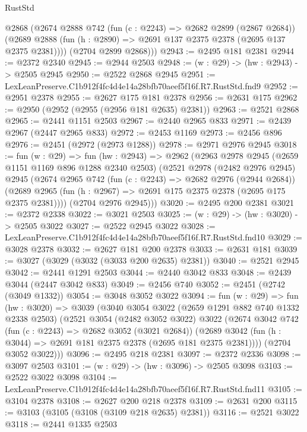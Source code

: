 \begin{lexlean}{RustStd}
\begin{coremodule}
        @2868
        (@2674
          @2888
          @742
          (fun (c : @2243) => @2682 @2899 (@2867 @2684))
          (@2689 @2888 (fun (h : @2890) => @2691 @137 @2375 @2378 (@2695 @137 @2375 @2381))))
        (@2704 @2899 @2868)))
@2943 := @2495 @181 @2381
@2944 := @2372 @2340
@2945 := @2944 @2503
@2948 := (w : @29) -> (hw : @2943) -> @2505 @2945
@2950 := @2522 @2868 @2945
@2951 := LexLeanPreserve.C1b912f4fc4d4e14a28bfb70aeef5f16f.R7.RustStd.fnd9
@2952 := @2951 @2378
@2955 := @2627 @175 @181 @2378
@2956 := @2631 @175
@2962 := @2950 (@2952 (@2955 (@2956 @181 @2635) @2381))
@2963 := @2521 @2868
@2965 := @2441 @1151 @2503
@2967 := @2440 @2965 @833
@2971 := @2439 @2967 (@2447 @2965 @833)
@2972 := @2453 @1169
@2973 := @2456 @896
@2976 := @2451 (@2972 (@2973 @1288))
@2978 := @2971 @2976 @2945
@3018 := fun (w : @29) =>
  fun (hw : @2943) =>
  @2962
    (@2963
      @2978
      @2945
      (@2659 @1151 @1169 @896 @1288 @2340 @2503)
      (@2521
        @2978
        (@2482 @2976 @2945)
        @2945
        (@2674
          @2965
          @742
          (fun (c : @2243) => @2682 @2976 (@2944 @2684))
          (@2689 @2965 (fun (h : @2967) => @2691 @175 @2375 @2378 (@2695 @175 @2375 @2381))))
        (@2704 @2976 @2945)))
@3020 := @2495 @200 @2381
@3021 := @2372 @2338
@3022 := @3021 @2503
@3025 := (w : @29) -> (hw : @3020) -> @2505 @3022
@3027 := @2522 @2945 @3022
@3028 := LexLeanPreserve.C1b912f4fc4d4e14a28bfb70aeef5f16f.R7.RustStd.fnd10
@3029 := @3028 @2378
@3032 := @2627 @181 @200 @2378
@3033 := @2631 @181
@3039 := @3027 (@3029 (@3032 (@3033 @200 @2635) @2381))
@3040 := @2521 @2945
@3042 := @2441 @1291 @2503
@3044 := @2440 @3042 @833
@3048 := @2439 @3044 (@2447 @3042 @833)
@3049 := @2456 @740
@3052 := @2451 (@2742 (@3049 @1332))
@3054 := @3048 @3052 @3022
@3094 := fun (w : @29) =>
  fun (hw : @3020) =>
  @3039
    (@3040
      @3054
      @3022
      (@2659 @1291 @882 @740 @1332 @2338 @2503)
      (@2521
        @3054
        (@2482 @3052 @3022)
        @3022
        (@2674
          @3042
          @742
          (fun (c : @2243) => @2682 @3052 (@3021 @2684))
          (@2689 @3042 (fun (h : @3044) => @2691 @181 @2375 @2378 (@2695 @181 @2375 @2381))))
        (@2704 @3052 @3022)))
@3096 := @2495 @218 @2381
@3097 := @2372 @2336
@3098 := @3097 @2503
@3101 := (w : @29) -> (hw : @3096) -> @2505 @3098
@3103 := @2522 @3022 @3098
@3104 := LexLeanPreserve.C1b912f4fc4d4e14a28bfb70aeef5f16f.R7.RustStd.fnd11
@3105 := @3104 @2378
@3108 := @2627 @200 @218 @2378
@3109 := @2631 @200
@3115 := @3103 (@3105 (@3108 (@3109 @218 @2635) @2381))
@3116 := @2521 @3022
@3118 := @2441 @1335 @2503

\end{coremodule}
\end{lexlean}
